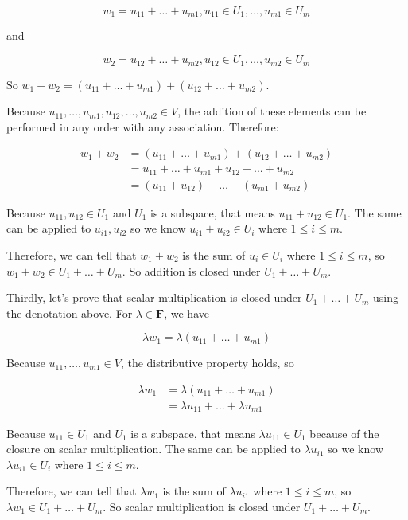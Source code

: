 \documentclass[12pt, letterpaper, oneside]{book}
\begin{document}
\[
  w_1 = u_{11} + \ldots + u_{m1}, u_{11} \in U_1, \ldots, u_{m1} \in U_m
\]

and

\[
  w_2 = u_{12} + \ldots + u_{m2}, u_{12} \in U_1, \ldots, u_{m2} \in U_m
\]

So $w_1 + w_2 = (u_{11} + \ldots + u_{m1}) + (u_{12} + \ldots + u_{m2})$.

Because $u_{11}, \ldots, u_{m1}, u_{12}, \ldots, u_{m2} \in V$, the addition of
these elements can be performed in any order with any association. Therefore:

\begin{align*}
  w_1 + w_2 & = (u_{11} + \ldots + u_{m1}) + (u_{12} + \ldots + u_{m2}) \\
            & = u_{11} + \ldots + u_{m1} + u_{12} + \ldots + u_{m2} \\
            & = (u_{11} + u_{12}) + \ldots + (u_{m1} + u_{m2})
\end{align*}

Because $u_{11}, u_{12} \in U_1$ and $U_1$ is a subspace, that means $u_{11} +
u_{12} \in U_1$. The same can be applied to $u_{i1}, u_{i2}$ so we know
$u_{i1} + u_{i2} \in U_i$ where $1 \leq i \leq m$.

Therefore, we can tell that $w_1 + w_2$ is the sum of $u_i \in U_i$ where
$1 \leq i \leq m$, so $w_1 + w_2 \in U_1 + \ldots + U_m$. So addition is closed
under $U_1 + \ldots + U_m$.

Thirdly, let's prove that scalar multiplication is closed under $U_1 + \ldots +
U_m$ using the denotation above. For $\lambda \in \mathbf{F}$, we have

\[
  \lambda w_1 = \lambda (u_{11} + \ldots + u_{m1})
\]

Because $u_{11}, \ldots, u_{m1} \in V$, the distributive property holds, so

\begin{align*}
  \lambda w_1 & = \lambda (u_{11} + \ldots + u_{m1}) \\
              & = \lambda u_{11} + \ldots + \lambda u_{m1}
\end{align*}

Because $u_{11} \in U_1$ and $U_1$ is a subspace, that means $\lambda u_{11}
\in U_1$ because of the closure on scalar multiplication. The same can be
applied to $\lambda u_{i1}$ so we know $\lambda u_{i1} \in U_i$ where $1 \leq i
\leq m$.

Therefore, we can tell that $\lambda w_1$ is the sum of $\lambda u_{i1}$ where
$1 \leq i \leq m$, so $\lambda w_1 \in U_1 + \ldots + U_m$. So scalar
multiplication is closed under $U_1 + \ldots + U_m$.
\end{document}

